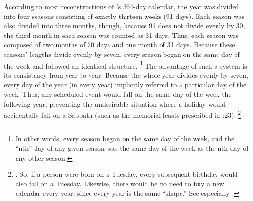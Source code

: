 According to most reconstructions of \jub's 364-day calendar, the year was divided into four seasons consisting of exactly thirteen weeks (91 days). Each season was also divided into three months, though, because 91 does not divide evenly by 30, the third month in each season was counted as 31 days. Thus, each season was composed of two months of 30 days and one month of 31 days. Because these seasons' lengths divide evenly by seven, every season began on the same day of the week and followed an identical structure.%
    \footnote{%
        In other words, every season began on the same day of the week, and the ``nth'' day of any given season was the same day of the week as the nth day of any other season.}
The advantage of such a system is its consistency from year to year. Because the whole year divides evenly by seven, every day of the year (in every year) implicitly referred to a particular day of the week. Thus, any scheduled event would fall on the same day of the week the following year, preventing the undesirable situation where a holiday would accidentally fall on a Sabbath (such as the memorial feasts prescribed in :23).%
    \footnote{%
        \Cite[233]{bergsma2007}. So, if a person were born on a Tuesday, every subsequent birthday would also fall on a Tuesday. Likewise, there would be no need to buy a new calendar every year, since every year is the same ``shape.'' See especially 
        \cite[253]{jaubert_vt1953}.}

